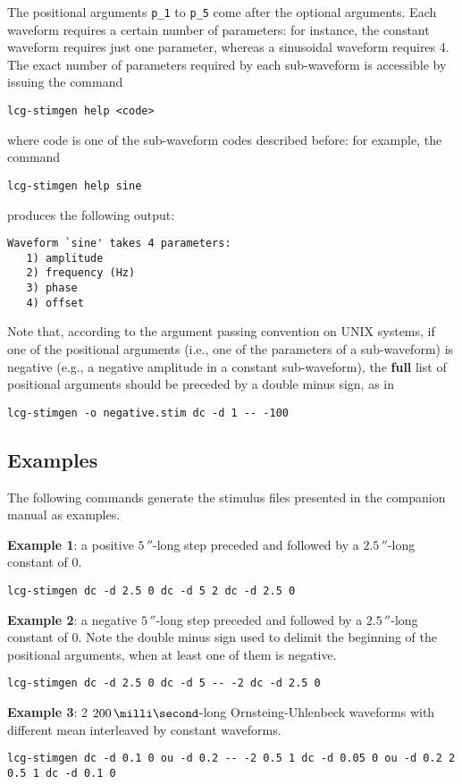 The positional arguments \verb+p_1+ to \verb+p_5+ come after the
optional arguments. Each waveform requires a certain number of
parameters: for instance, the constant waveform requires just one
parameter, whereas a sinusoidal waveform requires 4. The exact number
of parameters required by each sub-waveform is accessible by issuing
the command
\begin{lstlisting}
lcg-stimgen help <code>
\end{lstlisting}
where code is one of the sub-waveform codes described before: for
example, the command
\begin{lstlisting}
lcg-stimgen help sine
\end{lstlisting}
produces the following output:
\begin{verbatim}
Waveform `sine' takes 4 parameters:
   1) amplitude
   2) frequency (Hz)
   3) phase
   4) offset
\end{verbatim}
Note that, according to the argument passing convention on UNIX
systems, if one of the positional arguments (i.e., one of the
parameters of a sub-waveform) is negative (e.g., a negative amplitude
in a constant sub-waveform), the \textbf{full} list of positional
arguments should be preceded by a double minus sign, as in
\begin{lstlisting}
lcg-stimgen -o negative.stim dc -d 1 -- -100
\end{lstlisting}

\subsection{Examples}
The following commands generate the stimulus files presented in the
companion manual as examples.

\textbf{Example 1}: a positive $5\,\second$-long step preceded and
followed by a $2.5\,\second$-long constant of 0.
\begin{lstlisting}
lcg-stimgen dc -d 2.5 0 dc -d 5 2 dc -d 2.5 0
\end{lstlisting}

\textbf{Example 2}: a negative $5\,\second$-long step preceded and
followed by a $2.5\,\second$-long constant of 0. Note the double minus
sign used to delimit the beginning of the positional arguments, when
at least one of them is negative.
\begin{lstlisting}
lcg-stimgen dc -d 2.5 0 dc -d 5 -- -2 dc -d 2.5 0
\end{lstlisting}

\textbf{Example 3}: 2 $200\,\milli\second$-long Ornsteing-Uhlenbeck
waveforms with different mean interleaved by constant waveforms.
\begin{lstlisting}
lcg-stimgen dc -d 0.1 0 ou -d 0.2 -- -2 0.5 1 dc -d 0.05 0 ou -d 0.2 2 0.5 1 dc -d 0.1 0
\end{lstlisting}

